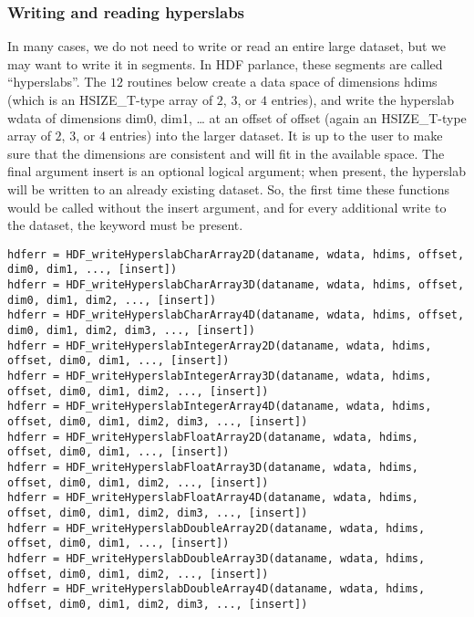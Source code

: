 \documentclass[DIV=calc, paper=letter, fontsize=11pt]{scrartcl}	 %
\begin{document}
\subsubsection{Writing and reading hyperslabs}
In many cases, we do not need to write or read an entire large dataset, but we may want to 
write it in segments.  In HDF parlance, these segments are called ``hyperslabs''.  The $12$ routines 
below create a data space of dimensions \textsf{hdims} (which is an \textsf{HSIZE\_T}-type array
of $2$, $3$, or $4$ entries), and write the hyperslab \textsf{wdata} of dimensions \textsf{dim0, dim1, \ldots}
at an offset of \textsf{offset} (again an \textsf{HSIZE\_T}-type array
of $2$, $3$, or $4$ entries) into the larger dataset.  It is up to the user to make sure that 
the dimensions are consistent and will fit in the available space.  The final argument \textsf{insert} is
an optional logical argument; when present, the hyperslab will be written to an already existing dataset.
So, the first time these functions would be called without the \textsf{insert} argument, and for every
additional write to the dataset, the keyword must be present.

{\footnotesize
\begin{verbatim}
hdferr = HDF_writeHyperslabCharArray2D(dataname, wdata, hdims, offset, dim0, dim1, ..., [insert])
hdferr = HDF_writeHyperslabCharArray3D(dataname, wdata, hdims, offset, dim0, dim1, dim2, ..., [insert])
hdferr = HDF_writeHyperslabCharArray4D(dataname, wdata, hdims, offset, dim0, dim1, dim2, dim3, ..., [insert])
hdferr = HDF_writeHyperslabIntegerArray2D(dataname, wdata, hdims, offset, dim0, dim1, ..., [insert])
hdferr = HDF_writeHyperslabIntegerArray3D(dataname, wdata, hdims, offset, dim0, dim1, dim2, ..., [insert])
hdferr = HDF_writeHyperslabIntegerArray4D(dataname, wdata, hdims, offset, dim0, dim1, dim2, dim3, ..., [insert])
hdferr = HDF_writeHyperslabFloatArray2D(dataname, wdata, hdims, offset, dim0, dim1, ..., [insert])
hdferr = HDF_writeHyperslabFloatArray3D(dataname, wdata, hdims, offset, dim0, dim1, dim2, ..., [insert])
hdferr = HDF_writeHyperslabFloatArray4D(dataname, wdata, hdims, offset, dim0, dim1, dim2, dim3, ..., [insert])
hdferr = HDF_writeHyperslabDoubleArray2D(dataname, wdata, hdims, offset, dim0, dim1, ..., [insert])
hdferr = HDF_writeHyperslabDoubleArray3D(dataname, wdata, hdims, offset, dim0, dim1, dim2, ..., [insert])
hdferr = HDF_writeHyperslabDoubleArray4D(dataname, wdata, hdims, offset, dim0, dim1, dim2, dim3, ..., [insert])
\end{verbatim}
}
\end{document}
